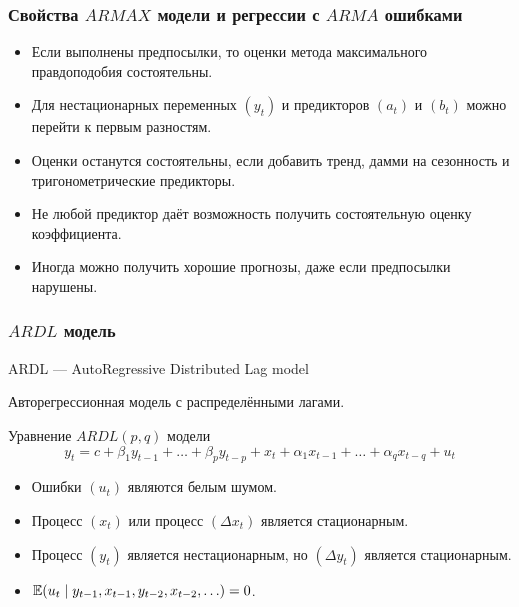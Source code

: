 \begin{frame}
  \frametitle{Свойства $ARMAX$ модели и регрессии с $ARMA$ ошибками}

  \begin{itemize}[<+->]
    \item Если выполнены предпосылки, то оценки метода максимального правдоподобия \alert{состоятельны}.
    \item Для нестационарных переменных $(y_t)$ и предикторов $(a_t)$ и $(b_t)$ можно перейти к первым \alert{разностям}. 
    \item Оценки \alert{останутся} состоятельны, если добавить тренд, дамми на сезонность и тригонометрические предикторы.
    \item \alert{Не любой} предиктор даёт возможность получить состоятельную оценку коэффициента. 
    \item \alert{Иногда} можно получить хорошие прогнозы, даже если предпосылки нарушены.
  \end{itemize}
  
\end{frame}



\begin{frame}
  \frametitle{$ARDL$ модель}
  
  \alert{ARDL} — \alert{A}uto\alert{R}egressive \alert{D}istributed \alert{L}ag model

  Авторегрессионная модель с распределёнными лагами.

  \begin{block}{Уравнение $ARDL(p, q)$ модели}
    \[
      y_t = c + \beta_1 y_{t-1} + \ldots + \beta_p y_{t-p} + x_t + \alpha_1 x_{t-1} + \ldots + \alpha_q x_{t-q} + u_t
    \]
  \end{block}
\pause
  \begin{itemize}[<+->]
    \item Ошибки $(u_t)$ являются \alert{белым шумом}. 
    \item Процесс $(x_t)$ \alert{или} процесс $(\Delta x_t)$ является стационарным. 
    \item Процесс $(y_t)$ является \alert{нестационарным}, но $(\Delta y_t)$ является стационарным. 
    \item $\mathbb{E}(u_t \mid y_{t-1}, x_{t-1}, y_{t-2}, x_{t-2}, \ldots) = 0$.
  \end{itemize}

\end{frame}

